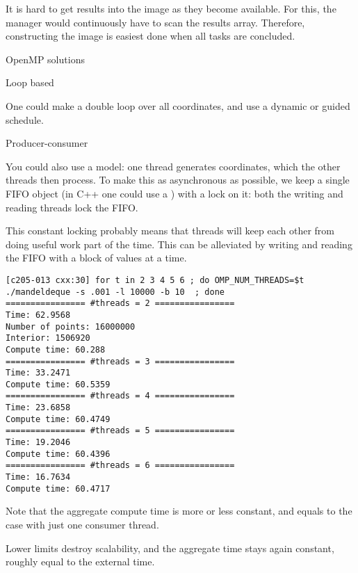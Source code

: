 It is hard to get results into the image as they become available. For
this, the manager would continuously have to scan the results
array. Therefore, constructing the image is easiest done when all
tasks are concluded.

 {OpenMP solutions}

 {Loop based}

One could make a double loop over all coordinates,
and use a dynamic or guided schedule.

 {Producer-consumer}
\label{sec:omp-mandel-oracle}

You could also use a  model:
one thread generates coordinates, which the other threads then process.
To make this as asynchronous as possible,
we keep a single FIFO object
(in C++ one could use a )
with a lock on it:
both the writing and reading threads lock the FIFO.

This constant locking probably means that threads will keep each other
from doing useful work part of the time.
This can be alleviated by writing and reading the FIFO
with a block of values at a time.

\begin{verbatim}
[c205-013 cxx:30] for t in 2 3 4 5 6 ; do OMP_NUM_THREADS=$t ./mandeldeque -s .001 -l 10000 -b 10  ; done
================ #threads = 2 ================
Time: 62.9568
Number of points: 16000000
Interior: 1506920
Compute time: 60.288
================ #threads = 3 ================
Time: 33.2471
Compute time: 60.5359
================ #threads = 4 ================
Time: 23.6858
Compute time: 60.4749
================ #threads = 5 ================
Time: 19.2046
Compute time: 60.4396
================ #threads = 6 ================
Time: 16.7634
Compute time: 60.4717
\end{verbatim}

Note that the aggregate compute time is more or less constant, and equals to the case
with just one consumer thread.

Lower limits destroy scalability,
and the aggregate time stays again constant,
roughly equal to the external time.

